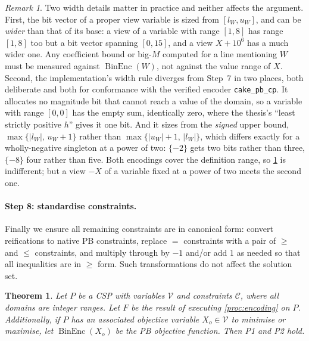 \documentclass[11pt,a4paper]{article}
\theoremstyle{plain}
\newtheorem{theoremT}{Theorem}
\theoremstyle{definition}
\theoremstyle{remark}
\newtheorem*{remark}{Remark}
\newcommand{\fname}[1]{\ensuremath{\operatorname{#1}}}
\newcommand{\BinEnc}{\fname{BinEnc}}
\newcommand{\code}[1]{\texttt{#1}}
\begin{document}
\begin{remark}
Two width details matter in practice and neither affects the argument.  First,
the bit vector of a proper view variable is sized from $[l_W,u_W]$, and can be
\emph{wider} than that of its base: a view of a variable with range $[1,8]$ has
range $[1,8]$ too but a bit vector spanning $[0,15]$, and a view $X+10^6$ has a
much wider one.  Any coefficient bound or big-$M$ computed for a line mentioning
$W$ must be measured against $\BinEnc(W)$, not against the value range of $X$.
Second, the implementation's width rule diverges from Step~7 in two places, both
deliberate and both for conformance with the verified encoder
\code{cake\_pb\_cp}.  It allocates no magnitude bit that cannot reach a value of
the domain, so a variable with range $[0,0]$ has the empty sum, identically zero,
where the thesis's ``least strictly positive $h$'' gives it one bit.  And it
sizes from the \emph{signed} upper bound, $\max\{|l_W|,\,u_W+1\}$ rather than
$\max\{|u_W|+1,\,|l_W|\}$, which differs exactly for a wholly-negative singleton
at a power of two: $\{-2\}$ gets two bits rather than three, $\{-8\}$ four rather
than five.  Both encodings cover the definition range, so \cref{thm:p1p2} is
indifferent; but a view $-X$ of a variable fixed at a power of two meets the
second one.
\end{remark}

\paragraph{Step 8: standardise constraints.}
Finally we ensure all remaining constraints are in canonical form: convert
reifications to native PB constraints, replace $=$ constraints with a pair of
$\geq$ and $\leq$ constraints, and multiply through by $-1$ and/or add $1$ as
needed so that all inequalities are in $\geq$ form.  Such transformations do not
affect the solution set.

\begin{theoremT}
\label{thm:p1p2}
Let $P$ be a CSP with variables $\mathcal V$ and constraints $\mathcal C$, where
all domains are integer ranges.  Let $F$ be the result of executing
\cref{proc:encoding} on $P$.  Additionally, if $P$ has an associated objective
variable $X_o\in\mathcal V$ to minimise or maximise, let $\BinEnc(X_o)$ be the
PB objective function.  Then P1 and P2 hold.
\end{theoremT}
\end{document}

